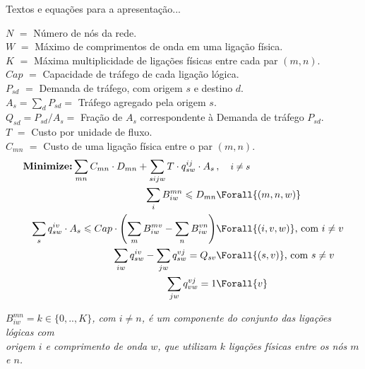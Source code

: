 

Textos e equa\c c\~oes para a apresenta\c c\~ao...

 \noindent$N$ $=$ N\'umero de n\'os da rede.\\
 $W$ $=$ M\'aximo de comprimentos de onda em uma liga\c c\~ao f\'isica.\\
 $K$ $=$ M\'axima multiplicidade de liga\c c\~oes f\'isicas entre cada par $(m,n)$.\\
 
\noindent $Cap$ $=$ Capacidade de tr\'afego de cada liga\c c\~ao l\'ogica.\\
 $P_{sd}$ $=$ Demanda de tr\'afego, com origem $s$ e destino $d$.\\
 $A_s = \sum_d P_{sd} =$ Tr\'afego agregado pela origem $s$. \\
 $Q_{sd}=P_{sd}/A_s =$ Fra\c c\~ao de $A_s$ correspondente \`a Demanda de tr\'afego $P_{sd}$.\\

  \noindent$T$ $=$ Custo por unidade de fluxo.\\
  $C_{mn}$ $=$ Custo de uma liga\c c\~ao f\'isica entre o par $(m,n)$.\\
 

$$
\begin{aligned}
\mbox{\textbf{Minimize:}}\sum_{mn} C_{mn}\cdot D_{mn} + \sum_{sijw} T\cdot q_{sw}^{ij}\cdot A_s \,&,\quad \mbox{\small$i\neq s$}\\
\sum_i B_{iw}^{mn} \leqslant D_{mn} &\Forall{(m,n,w)}\\
\sum_{s} q_{sw}^{iv}\cdot A_s \leqslant Cap\cdot \left(\sum_{m} B_{iw}^{mv} - \sum_{n} B_{iw}^{vn}\right) &\Forall{(i,v,w)} \mbox{, com $i\neq v$}\\
\sum_{iw} q_{sw}^{iv} - \sum_{jw} q_{sw}^{vj} = Q_{sv} &\Forall{(s,v)} \mbox{, com $s\neq v$}\\
\sum_{jw} q_{vw}^{vj} = 1 &\Forall{v} 
\end{aligned}
$$

{\noindent \begin{flushright}\emph{
     $B_{iw}^{mn} = k\in \{0,..,K\}$, com $i\neq n$, \'e um componente do conjunto das liga\c c\~oes l\'ogicas com \\
     origem $i$ e comprimento de onda $w$, que utilizam $k$ liga\c c\~oes f\'isicas entre os n\'os $m$ e $n$.
}\end{flushright}}
 
